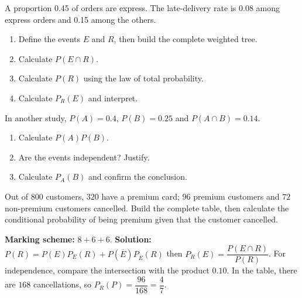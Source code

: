 \begin{exercise}
A proportion \num{0,45} of orders are express. The late-delivery rate is \num{0,08} among express orders and \num{0,15} among the others.
\begin{enumerate}
\item Define the events $E$ and $R$, then build the complete weighted tree.
\item Calculate $P(E\cap R)$.
\item Calculate $P(R)$ using the law of total probability.
\item Calculate $P_R(E)$ and interpret.
\end{enumerate}
\end{exercise}
\begin{exercise}[2 -- Independence]
In another study, $P(A)=\num{0,4}$, $P(B)=\num{0,25}$ and $P(A\cap B)=\num{0,14}$.
\begin{enumerate}
\item Calculate $P(A)P(B)$.
\item Are the events independent? Justify.
\item Calculate $P_A(B)$ and confirm the conclusion.
\end{enumerate}
\end{exercise}
\begin{exercise}
Out of $800$ customers, $320$ have a premium card; $96$ premium customers and $72$ non-premium customers cancelled. Build the complete table, then calculate the conditional probability of being premium given that the customer cancelled.
\end{exercise}
\begin{solution}\textbf{Marking scheme:} $8+6+6$. \textbf{Solution:} $P(R)=P(E)P_E(R)+P(\overline E)P_{\overline E}(R)$ then $P_R(E)=\dfrac{P(E\cap R)}{P(R)}$. For independence, compare the intersection with the product $\num{0,10}$. In the table, there are $168$ cancellations, so $P_R(P)=\dfrac{96}{168}=\dfrac47$.\end{solution}

